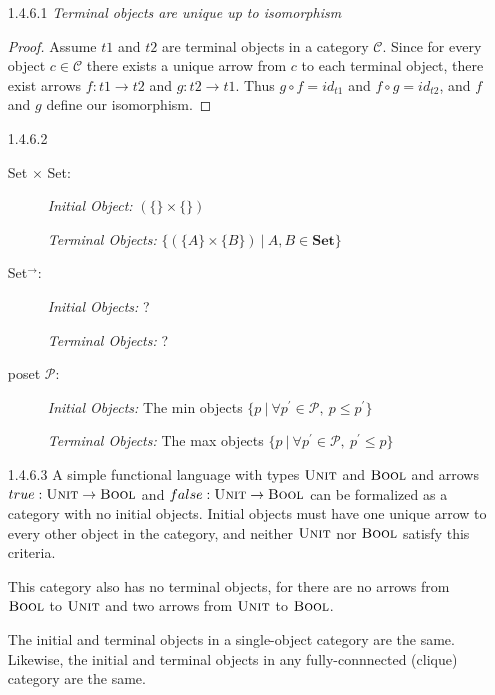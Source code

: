 \documentclass{article}
\begin{document}
\begin{enumerate}
\item[1.4.6.1]
  \textit{Terminal objects are unique up to isomorphism}
  \begin{proof}
    Assume $t1$ and $t2$ are terminal objects in a category $\mathcal{C}$.
    Since for every object $c\in\mathcal{C}$ there exists a unique arrow
    from $c$ to each terminal object, there exist arrows $f:t1\rightarrow t2$
    and $g:t2 \rightarrow t1$. Thus $g \circ f = id_{t1}$ and $f \circ g = id_{t2}$,
    and $f$ and $g$ define our isomorphism.
  \end{proof}

\item[1.4.6.2]
  \begin{description}
  \item[Set $\times$ Set:]
  \item[]
    \textit{Initial Object:} $(\{\} \times \{\})$
  \item[]
    \textit{Terminal Objects:} $\{ (\{A\} \times \{B\} )\ |\ A,B \in \textbf{Set} \}$
  \item[Set$^\rightarrow$:]
  \item[]
    \textit{Initial Objects:} ? %
  \item[]
    \textit{Terminal Objects:} ? %
  \item[poset $\mathcal{P}$:]
  \item[]
    \textit{Initial Objects:} The min objects
    $\{ p \ |\ \forall p^\prime\in \mathcal{P},\ p \le p^\prime \}$
  \item[]
    \textit{Terminal Objects:} The max objects 
    $\{ p \ |\ \forall p^\prime\in \mathcal{P},\ p^\prime \le p \}$
  \end{description}

\item[1.4.6.3]
  A simple functional language with types $\textsc{Unit}$ and $\textsc{Bool}$
  and arrows 
  $true: \textsc{Unit} \rightarrow \textsc{Bool}$ and
  $false: \textsc{Unit} \rightarrow \textsc{Bool}$
  can be formalized as a category with no initial objects.
  Initial objects must have one unique arrow to every other object in the 
  category, and neither $\textsc{Unit}$ nor $\textsc{Bool}$ satisfy
  this criteria.

  This category also has no terminal objects, for 
  there are no arrows from $\textsc{Bool}$ to $\textsc{Unit}$
  and two arrows from $\textsc{Unit}$ to $\textsc{Bool}$.
  
  The initial and terminal objects in a single-object category are the same. 
  Likewise, the initial and terminal objects in any fully-connnected (clique) category 
  are the same.
\end{enumerate}
\end{document}
